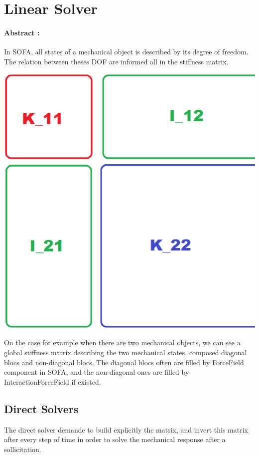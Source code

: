 \documentclass[a4paper,10pt]{article}
\begin{document}
\section{Linear Solver}
\paragraph{Abstract : }
In SOFA, all states of a mechanical object is described by its degree of freedom. The relation between theses DOF are informed all in the stiffness matrix. 
\begin{center}
\includegraphics[scale=0.3]{matrix_bloc}
\end{center}
On the case for example when there are two mechanical objects, we can see a global stiffness matrix describing the two mechanical states, composed diagonal blocs and non-diagonal blocs. The diagonal blocs often are filled by ForceField component in SOFA, and the non-diagonal ones are filled by InteractionForceField if existed.
\subsection{Direct Solvers }
The direct solver demande to build explicitly the matrix, and invert this matrix after every step of time in order to solve the mechanical response after a sollicitation.
\end{document}
